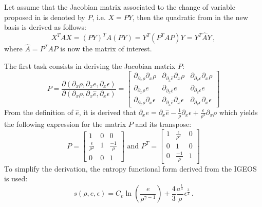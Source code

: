 \documentclass[times,doublespace]{fldauth}%
\begin{document}
Let assume that the Jacobian matrix associated to the change of variable proposed in  is denoted by $P$, i.e. $X=PY$, then the quadratic from in the new basis is derived as follows:
%
\begin{equation}
X^T A X =  (PY)^T A (PY) = Y^T (P^T A P) Y = Y^T \hat{A} Y \, ,
\end{equation}
%
where $\hat{A} = P^T A P$ is now the matrix of interest.

The first task consists in deriving the Jacobian matrix $P$:
%
\begin{equation}
P = \frac{\partial (\partial_x \rho, \partial_x e, \partial_x \epsilon)}{\partial (\partial_x \rho, \partial_x \hat{e}, \partial_x \epsilon)} = 
\begin{bmatrix}
\partial_{\partial_x \rho} \partial_x \rho & \partial_{\partial_x \hat{e}} \partial_x \rho & \partial_{\partial_x \epsilon} \partial_x \rho \\
\partial_{\partial_x \rho} e & \partial_{\partial_x \hat{e}} e & \partial_{\partial_x \epsilon} e \\
\partial_{\partial_x \rho} \partial_x \epsilon & \partial_{\partial_x \hat{e}} \partial_x \epsilon & \partial_{\partial_x \epsilon} \partial_x \epsilon
\end{bmatrix}
\end{equation}
%
From the definition of $\hat{e}$, it is derived that $\partial_x e = \partial_x \hat{e} - \frac{1}{\rho} \partial_x \epsilon + \frac{\epsilon}{\rho^2} \partial_x \rho$ which yields the following expression for the matrix $P$ and its transpose:
%
\begin{equation}\label{eq:jac}
P =
\begin{bmatrix}
1 & 0 & 0 \\
\frac{\epsilon}{\rho^2} & 1 & \frac{-1}{\rho} \\
0 & 0 & 1
\end{bmatrix}
\text{ and }
P^T =
\begin{bmatrix}
1 & \frac{\epsilon}{\rho^2} & 0 \\
0 & 1 & 0 \\
0 & \frac{-1}{\rho} & 1
\end{bmatrix}
\end{equation}
%
To simplify the derivation, the entropy functional form derived from the IGEOS is used:
%
\begin{equation}\label{eq:entropy}
s(\rho, e, \epsilon) = C_v \ln \left( \frac{e}{\rho^{\gamma-1}} \right) + \frac{4}{3} \frac{a^\frac{1}{4}}{\rho} \epsilon^\frac{3}{4} \, .
\end{equation}
\end{document}
